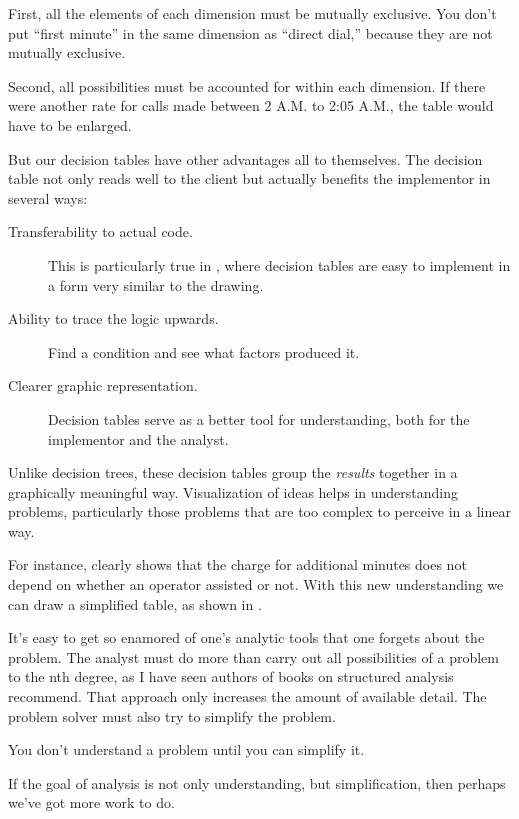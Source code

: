 First, all the elements of each dimension must be mutually exclusive.
You don't put ``first minute'' in the same dimension as ``direct
dial,'' because they are not mutually exclusive.

Second, all possibilities must be accounted for within each dimension.
If there were another rate for calls made between 2 A.M. to 2:05 A.M.,
the table would have to be enlarged.

But our decision tables have other advantages all to themselves.  The
decision table not only reads well to the client but actually benefits
the implementor in several ways:

\begin{description}
\item[Transferability to actual code.] This is particularly true in
\Forth{}, where decision tables are easy to implement in a form very
similar to the drawing.

\item[Ability to trace the logic upwards.] Find a condition and see what
factors produced it.

\item[Clearer graphic representation.] Decision tables serve as a better tool
for understanding, both for the implementor and the analyst.
\end{description}

Unlike decision trees, these decision tables group the \emph{results}
together in a graphically meaningful way. Visualization of ideas helps in
understanding problems, particularly those problems that are too
complex to perceive in a linear way.

For instance,  clearly shows that the charge for
additional minutes does not depend on whether an operator assisted or not.
With this new understanding we can draw a simplified table, as shown
in .



It's easy to get so enamored of one's analytic tools that one forgets
about the problem. The analyst must do more than carry out all
possibilities of a problem to the nth degree, as I have seen authors
of books on structured analysis recommend. That approach only
increases the amount of available detail. The problem solver must also
try to simplify the problem.

\begin{tip}
You don't understand a problem until you can simplify it.
\end{tip}
If the goal of analysis is not only understanding, but simplification, then
perhaps we've got more work to do.


